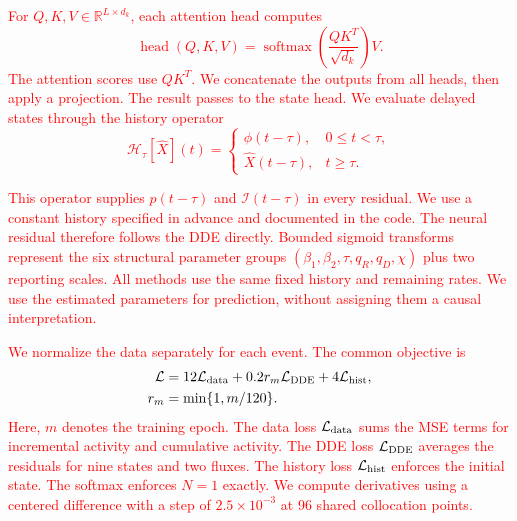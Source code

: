 \documentclass[letterpaper,journal]{IEEEtran}
\begin{document}
\textcolor{red}{
For $Q,K,V\in\mathbb R^{L\times d_k}$, each attention head computes
\begin{equation}
\operatorname{head}(Q,K,V)=
\operatorname{softmax}\!\left(\frac{QK^T}{\sqrt{d_k}}\right)V.
\label{eq:attention}
\end{equation}
The attention scores use $QK^T$. We concatenate the outputs from all heads, then apply a projection. The result passes to the state head.
We evaluate delayed states through the history operator
\begin{equation}
\mathcal H_\tau[\widehat X](t)=
\begin{cases}
\phi(t-\tau),&0\leq t<\tau,\\
\widehat X(t-\tau),&t\geq\tau.
\end{cases}
\label{eq:history_operator}
\end{equation}
}

\textcolor{red}{
This operator supplies $p(t-\tau)$ and $\mathcal I(t-\tau)$ in every residual. We use a constant history specified in advance and documented in the code. The neural residual therefore follows the DDE directly.
Bounded sigmoid transforms represent the six structural parameter groups $(\beta_1,\beta_2,\tau,q_R,q_D,\chi)$ plus two reporting scales. All methods use the same fixed history and remaining rates. We use the estimated parameters for prediction, without assigning them a causal interpretation.
}

\textcolor{red}{
We normalize the data separately for each event. The common objective is
\begin{equation}
\begin{aligned}
\mathcal L&=12\mathcal L_{\rm data}+0.2r_m\mathcal L_{\rm DDE}
+4\mathcal L_{\rm hist},\\
r_m&=\min\{1,m/120\}.
\end{aligned}
\label{eq:transpinn_loss}
\end{equation}
Here, $m$ denotes the training epoch. The data loss $\mathcal L_{\rm data}$ sums the MSE terms for incremental activity and cumulative activity. The DDE loss $\mathcal L_{\rm DDE}$ averages the residuals for nine states and two fluxes. The history loss $\mathcal L_{\rm hist}$ enforces the initial state. The softmax enforces $N=1$ exactly. We compute derivatives using a centered difference with a step of $2.5\times10^{-3}$ at 96 shared collocation points.
}
\end{document}
